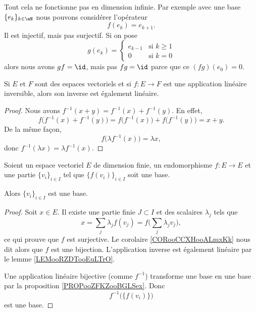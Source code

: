 \begin{example}
	Tout cela ne fonctionne pas en dimension infinie. Par exemple avec une base \( \{ e_k \}_{k\in \eN}\) nous pouvons considérer l'opérateur
	\begin{equation}
		f(e_k)=e_{k+1}.
	\end{equation}
	Il est injectif, mais pas surjectif. Si on pose
	\begin{equation}
		g(e_k)=\begin{cases}
			e_{k-1} & \text{si } k\geq 1 \\
			0       & \text{si } k=0
		\end{cases}
	\end{equation}
	alors nous avons \( gf=\id\), mais pas \( fg=\id\) parce que ce \( (fg)(e_0)=0\).
\end{example}

\begin{lemma}       \label{LEMooRZDTooEuLTrO}
	Si \( E\) et \( F\) sont des espaces vectoriels et si \( f\colon E\to F\) est une application linéaire inversible, alors son inverse est également linéaire.
\end{lemma}

\begin{proof}
	Nous avons \( f^{-1}(x+y)=f^{-1}(x)+f^{-1}(y)\). En effet,
	\begin{equation}
		f\big( f^{-1}(x)+f^{-1}(y) \big)=f\big( f^{-1}(x) \big)+f\big( f^{-1}(y) \big)=x+y.
	\end{equation}
	De la même façon,
	\begin{equation}
		f\big( \lambda f^{-1}(x) \big)=\lambda x,
	\end{equation}
	donc \( f^{-1}(\lambda x)=\lambda f^{-1}(x)\).
\end{proof}

\begin{proposition}     \label{PROPooHLUYooNsDgbn}
	Soient un espace vectoriel \( E\) de dimension finie, un endomorphisme \( f\colon E\to E\) et une partie \( \{v_i\}_{i\in I}\) tel que \( \{f(v_i)\}_{i\in I}\) soit une base.

	Alors \( \{v_i\}_{i\in I}\) est une base.
\end{proposition}

\begin{proof}
	Soit \( x\in E\). Il existe une partie finie \( J\subset I\) et des scalaires \( \lambda_j\) tels que
	\begin{equation}
		x=\sum_j\lambda_jf(v_j)=f\big( \sum_j\lambda_jv_j \big),
	\end{equation}
	ce qui prouve que \( f\) est surjective. Le corolaire \ref{CORooCCXHooALmxKk} nous dit alors que \( f\) est une bijection. L'application inverse est également linéaire par le lemme \ref{LEMooRZDTooEuLTrO}.

	Une application linéaire bijective (comme \( f^{-1}\)) transforme une base en une base par la proposition \ref{PROPooZFKZooBGLSex}. Donc
	\begin{equation}
		f^{-1}\big( \{f(v_i)\} \big)
	\end{equation}
	est une base.
\end{proof}

